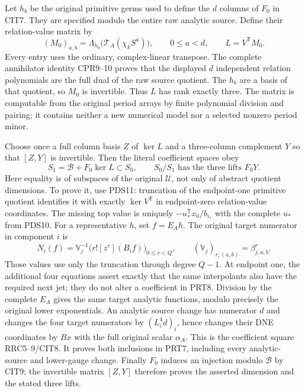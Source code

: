\documentclass[11pt,a4paper]{article}
\begin{document}
Let $h_b$ be the original primitive germs used to define the $d$ columns
of $F_0$ in CIT7. They are specified modulo the entire raw analytic
source. Define their relation-value matrix by
\[
 (M_0)_{a,b}=\Lambda_{h_b}
                  \bigl(\mathcal T_A(\chi_k S^a)\bigr),
             \qquad0\le a<d,
 \qquad L=V^{\mathsf T}M_0.
 \tag{PRT6}
\]
Every entry uses the ordinary, complex-linear transpose. The complete
annihilator identity CPR9--10 proves that the displayed $d$ independent
relation polynomials are the full dual of the raw source quotient.
The $h_b$ are a basis of that quotient, so $M_0$ is invertible. Thus
$L$ has rank exactly three. The matrix is computable from the original
period arrays by finite polynomial division and pairing; it contains
neither a new numerical model nor a selected nonzero period minor.

Choose once a full column basis $Z$ of $\ker L$ and a three-column
complement $Y$ so that $[Z,Y]$ is invertible. Then the literal coefficient
spaces obey
\[
 \boxed{\quad S_1=\mathscr B+F_0\ker L\subset S_0,
       \qquad S_0/S_1\text{ has the three lifts }F_0Y.\quad}
 \tag{PRT7}
\]
Here equality is of subspaces of the original $\mathcal U$, not only
of abstract quotient dimensions. To prove it, use PDS11: truncation of
the endpoint-one primitive quotient identifies it with exactly
$\ker V^{\mathsf T}$ in endpoint-zero relation-value coordinates.
The missing top value is uniquely
$-u_*^{\mathsf T}x_0/b_{i_*}$ with the complete $u_*$ from PDS10.
For a representative $h$, set $f=E_Ah$. The original target numerator
in component $i$ is
\[
 N_i(f)=\mathbb V_j^{-1}
        \bigl(r![z^r](B_i f)\bigr)_{0\le r<Q},
 \qquad(\mathbb V_j)_{r,(a,b)}=\beta_{j,a,b}^{r}.
 \tag{PRT8}
\]
Those values use only the truncation through degree $Q-1$.
At endpoint one, the additional four equations assert exactly that
the same interpolants also have the required next jet; they do not
alter a coefficient in PRT8. Division by the complete $E_A$ gives
the same target analytic functions, modulo precisely the original lower
exponentials. An analytic source change has numerator $d$ and changes
the four target numerators by $(L_i^4d)_i$, hence changes their DNE
coordinates by $Bx$ with the full original scalar $\alpha_A$.
This is the coefficient square RRC5--9/CIT8. It proves both inclusions
in PRT7, including every analytic-source and lower-gauge change.
Finally $F_0$ induces an injection modulo $\mathscr B$ by CIT9;
the invertible matrix $[Z,Y]$ therefore proves the asserted dimension
and the stated three lifts.
\end{document}
